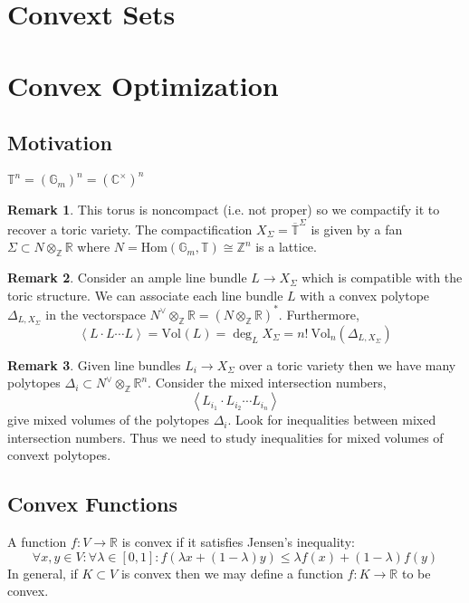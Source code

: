 \documentclass[12pt]{extarticle}
\newcommand{\Z}{\mathbb{Z}}
\newcommand{\R}{\mathbb{R}}
\newcommand{\C}{\mathbb{C}}
\newcommand{\Hom}[2]{\mathrm{Hom}\left( #1, #2 \right)}
\theoremstyle{definition}
\newtheorem{remark}{Remark}
\newenvironment{definition}[1][Definition:]{\begin{trivlist}
\item[\hskip \labelsep {\bfseries #1}]}{\end{trivlist}}
\newcommand{\T}{\mathbb{T}}
\newcommand{\Gm}{\mathbb{G}_m}
\newcommand{\Vol}[2]{\mathrm{Vol}_{#1}\left( #2 \right)}
\begin{document}
\section{Convext Sets}

\section{Convex Optimization}

\subsection{Motivation}

\begin{definition}
$\T^n = (\Gm)^n = (\C^\times)^n$
\end{definition}

\begin{remark}
This torus is noncompact (i.e. not proper) so we compactify it to recover a toric variety. The compactification $X_\Sigma = \overline{\T}^\Sigma$ is given by a fan $\Sigma \subset N \otimes_\Z \R$ where $N = \Hom{\Gm}{\T} \cong \Z^n$ is a lattice. 
\end{remark}

\begin{remark}
Consider an ample line bundle $L \to X_\Sigma$ which is compatible with the toric structure. We can associate each line bundle $L$ with a convex polytope $\Delta_{L, X_\Sigma}$ in the vectorspace $N^\vee \otimes_\Z \R = (N \otimes_\Z \R)^*$. Furthermore,
\[ \left< L \cdot L \cdots L \right> = \Vol{}{L} = \deg_L X_\Sigma = n! \: \Vol{n}{\Delta_{L, X_\Sigma}} \]
\end{remark}

\begin{remark}
Given line bundles $L_i \to X_\Sigma$ over a toric variety then we have many polytopes $\Delta_i \subset N^\vee \otimes_\Z \R^n$. Consider the mixed intersection numbers,
\[ \left< L_{i_1} \cdot L_{i_2} \cdots L_{i_n} \right> \]
give mixed volumes of the polytopes $\Delta_i$. Look for inequalities between mixed intersection numbers. Thus we need to study inequalities for mixed volumes of convext polytopes. 
\end{remark}

\subsection{Convex Functions}

\begin{definition}
A function $f : V \to \R$ is convex if it satisfies Jensen's inequality:
\[ \forall x,y \in V : \forall \lambda \in [0, 1] : f(\lambda x + (1 - \lambda) y) \le \lambda f(x) + (1 - \lambda) f(y) \]
In general, if $K \subset V$ is convex then we may define a function $f : K \to \R$ to be convex.
\end{definition}
\end{document}
